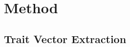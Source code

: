 \documentclass[11pt]{article}
\begin{document}
\section{Method}



\subsection{Trait Vector Extraction}
\end{document}
